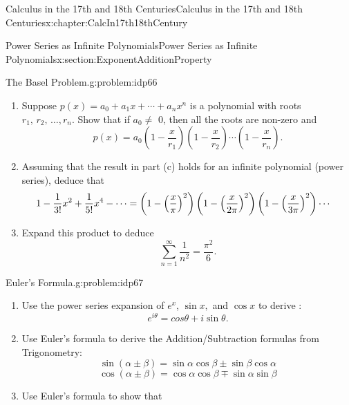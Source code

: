 \begin{chapterptx}{Calculus in the 17th and 18th Centuries}{}{Calculus in the 17th and 18th Centuries}{}{}{x:chapter:CalcIn17th18thCentury}
\begin{sectionptx}{Power Series as Infinite Polynomials}{}{Power Series as Infinite Polynomials}{}{}{x:section:ExponentAdditionProperty}
\begin{problem}{The Basel Problem.}{g:problem:idp66}
\begin{enumerate}[font=\bfseries,label=(\alph*),ref=\alph*]
\begin{equation*}
					x=\pm\pi,\,\pm 2\pi,\,\pm 3\pi,\,\ldots
				\end{equation*}
				\item{}Suppose \(p(x)=a_0+a_1x+\cdots+a_nx^n\) is a polynomial with roots \(r_1,\,r_2,\,\ldots,r_n\). Show that if \(a_0\neq\) \(0\), then all the roots are non-zero and%
				\begin{equation*}
					p(x)=a_0\left(1-\frac{x}{r_1}\right)\left(1-\frac{x}{r_2}\right)\cdots\left(1-\frac{x}{r_n}\right)\text{.}
				\end{equation*}
				\item{}Assuming that the result in part (c) holds for an infinite polynomial (power series), deduce that%
				\begin{align*}
					1-\frac{1}{3!}x^2+\frac{1}{5!}x^4-\cdots& =\left(1-\left(\frac{x}{\pi}\right)^2\right)\left(1-\left(\frac{x}{2\pi}\right)^2\right)\left(1-\left(\frac{x}{3\pi}\right)^2\right)\cdots
				\end{align*}
				\item{}Expand this product to deduce%
				\begin{equation*}
					\sum_{n=1}^\infty\frac{1}{n^2}=\frac{\pi^2}{6}.{}
				\end{equation*}
			\end{enumerate}
		\end{problem}
		\begin{problem}{Euler's Formula.}{g:problem:idp67}%
			\begin{enumerate}[font=\bfseries,label=(\alph*),ref=\alph*]
				\item{}Use  the power series expansion of \(e^x\), \(\sin x,\) and \(\cos x\) to derive :%
				\begin{equation*}
					e^{i\theta} = cos\theta+i\sin\theta.
				\end{equation*}
				\item{}Use Euler's formula to derive the Addition\slash{}Subtraction formulas from Trigonometry:%
				\begin{equation*}
					\sin(\alpha\pm\beta) = \sin\alpha\cos\beta\pm\sin\beta\cos\alpha
				\end{equation*}
				\begin{equation*}
					\cos(\alpha\pm\beta) = \cos\alpha\cos\beta\mp\sin\alpha\sin\beta
				\end{equation*}
				\item{}Use Euler's formula to show that%
				\begin{equation*}

\end{equation*}
\end{enumerate}
\end{problem}
\end{sectionptx}
\end{chapterptx}
